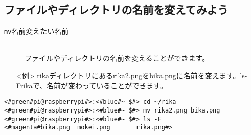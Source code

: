 \subsection{ファイルやディレクトリの名前を変えてみよう}
\begin{description}
\item[\texttt{mv}\textvisiblespace 名前\textvisiblespace 変えたい名前]\mbox{}\\
ファイルやディレクトリの名前を変えることができます。
\end{description}
\begin{itemize}
\item[<例>]rikaディレクトリにあるrika2.pngをbika.pngに名前を変えます。ls\textvisiblespace -F\textvisiblespace rikaで、名前が変わっていることができます。
\end{itemize}
\begin{lstlisting}[caption=mvNameの例, label=mvName]
<#green#pi@raspberrypi#>:<#blue#~ $#> cd ~/rika
<#green#pi@raspberrypi#>:<#blue#~ $#> mv rika2.png bika.png
<#green#pi@raspberrypi#>:<#blue#~ $#> ls -F
<#magenta#bika.png	mokei.png		rika.png#>
\end{lstlisting}

\begin{tcolorbox}[title=\useOmetoi]
\begin{enumerate}
\end{enumerate}
\end{tcolorbox}
